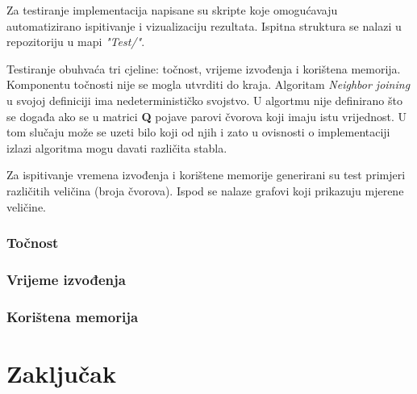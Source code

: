 \documentclass[times, utf8, seminar, numeric]{fer}
\begin{document}
Za testiranje implementacija napisane su skripte koje omogućavaju automatizirano ispitivanje i vizualizaciju rezultata. Ispitna struktura se nalazi u repozitoriju u mapi \emph{"Test/"}.

Testiranje obuhvaća tri cjeline: točnost, vrijeme izvođenja i korištena memorija. Komponentu točnosti nije se mogla utvrditi do kraja. Algoritam \emph{Neighbor joining} u svojoj definiciji ima nedeterminističko svojstvo. U algortmu nije definirano što se događa ako se u matrici \textbf{Q} pojave parovi čvorova koji imaju istu vrijednost. U tom slučaju može se uzeti bilo koji od njih i zato u ovisnosti o implementaciji izlazi algoritma mogu davati različita stabla.

Za ispitivanje vremena izvođenja i korištene memorije generirani su test primjeri različitih veličina (broja čvorova). Ispod se nalaze grafovi koji prikazuju mjerene veličine.

\subsection{Točnost}
\subsection{Vrijeme izvođenja}
\subsection{Korištena memorija}

\chapter{Zaključak}

\end{document}
